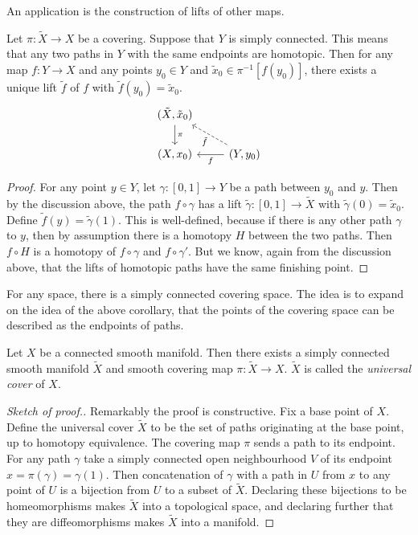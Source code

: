 An application is the construction of lifts of other maps.
\begin{corollary}
\textup{\cite[Prop~1.33]{Hatcher}}
Let $\pi : \tilde{X} \to X$ be a covering.
Suppose that $Y$ is simply connected.
This means that any two paths in $Y$ with the same endpoints are homotopic.
Then for any map $f : Y \to X$ and any points $y_0 \in Y$ and $\tilde{x}_0 \in \pi^{-1}[f(y_0)]$, there exists a unique lift $\tilde{f}$ of $f$ with $\tilde{f}(y_0) = \tilde{x}_0$.
\[\begin{tikzcd}
(\tilde{X},\tilde{x}_0) \arrow{d}{\pi} & \\
(X,x_0) & (Y,y_0) \arrow{l}{f} \arrow[dashed]{lu}{\tilde{f}}
\end{tikzcd}\]
\end{corollary}
\begin{proof}
For any point $y \in Y$, let $\gamma : [0,1] \to Y$ be a path between $y_0$ and $y$.
Then by the discussion above, the path $f \circ \gamma$ has a lift $\tilde{\gamma} : [0,1] \to \tilde{X}$ with $\tilde{\gamma}(0) = \tilde{x}_0$.
Define $\tilde{f}(y) = \tilde{\gamma}(1)$.
This is well-defined, because if there is any other path $\gamma$ to $y$, then by assumption there is a homotopy $H$ between the two paths.
Then $f\circ H$ is a homotopy of $f\circ\gamma$ and $f\circ\gamma'$.
But we know, again from the discussion above, that the lifts of homotopic paths have the same finishing point.
\end{proof}

For any space, there is a simply connected covering space.
The idea is to expand on the idea of the above corollary, that the points of the covering space can be described as the endpoints of paths.

\begin{theorem}
\textup{\cite[p.63]{Hatcher}}
Let $X$ be a connected smooth manifold.
Then there exists a simply connected smooth manifold $\tilde{X}$ and smooth covering map $\pi : \tilde{X} \to X$.
$\tilde{X}$ is called the \emph{universal cover} of $X$. 
\end{theorem}
\begin{proof}[Sketch of proof.]
Remarkably the proof is constructive.
Fix a base point of $X$.
Define the universal cover $\tilde{X}$ to be the set of paths originating at the base point, up to homotopy equivalence.
The covering map $\pi$ sends a path to its endpoint.
For any path $\gamma$ take a simply connected open neighbourhood $V$ of its endpoint $x = \pi(\gamma) = \gamma(1)$.
Then concatenation of $\gamma$ with a path in $U$ from $x$ to any point of $U$ is a bijection from $U$ to a subset of $\tilde{X}$.
Declaring these bijections to be homeomorphisms makes $\tilde{X}$ into a topological space, and declaring further that they are diffeomorphisms makes $\tilde{X}$ into a manifold.
\end{proof}

